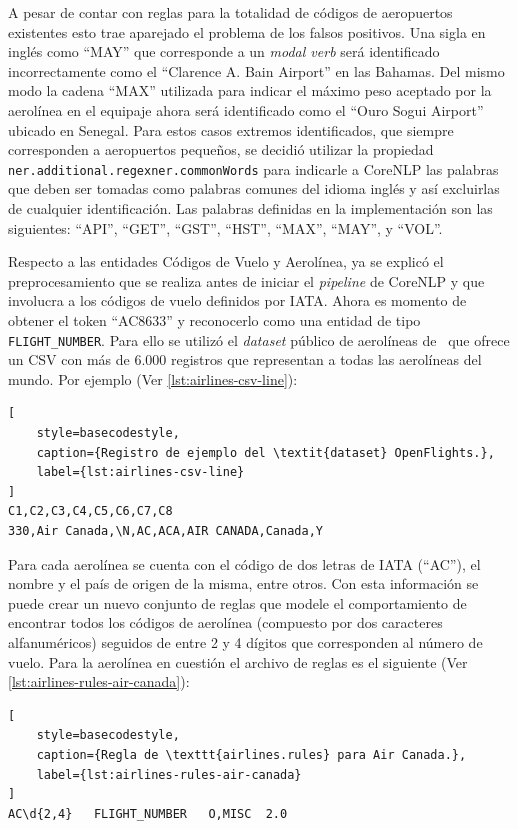 A pesar de contar con reglas para la totalidad de códigos de aeropuertos existentes esto trae aparejado el problema de
los falsos positivos.
Una sigla en inglés como ``MAY'' que corresponde a un \textit{modal verb} será identificado incorrectamente como el
``Clarence A. Bain Airport'' en las Bahamas.
Del mismo modo la cadena ``MAX'' utilizada para indicar el máximo peso aceptado por la aerolínea en el equipaje ahora
será identificado como el ``Ouro Sogui Airport'' ubicado en Senegal.
Para estos casos extremos identificados, que siempre corresponden a aeropuertos pequeños, se decidió utilizar la
propiedad \texttt{ner.additional.regexner.commonWords} para indicarle a CoreNLP las palabras que deben ser tomadas como
palabras comunes del idioma inglés y así excluirlas de cualquier identificación.
Las palabras definidas en la implementación son las siguientes: ``API'', ``GET'', ``GST'', ``HST'', ``MAX'', ``MAY'', y
``VOL''.

Respecto a las entidades Códigos de Vuelo y Aerolínea, ya se explicó el preprocesamiento que se realiza antes de iniciar
el \textit{pipeline} de CoreNLP y que involucra a los códigos de vuelo definidos por IATA\@.
Ahora es momento de obtener el token ``AC8633'' y reconocerlo como una entidad de tipo \texttt{FLIGHT\_NUMBER}.
Para ello se utilizó el \textit{dataset} público de aerolíneas de~\cite{openflights-data}
que ofrece un CSV con más de 6.000 registros que representan a todas las aerolíneas del mundo.
Por ejemplo (Ver \autoref{lst:airlines-csv-line}):

\begin{lstlisting}[
    style=basecodestyle,
    caption={Registro de ejemplo del \textit{dataset} OpenFlights.},
    label={lst:airlines-csv-line}
]
C1,C2,C3,C4,C5,C6,C7,C8
330,Air Canada,\N,AC,ACA,AIR CANADA,Canada,Y
\end{lstlisting}

Para cada aerolínea se cuenta con el código de dos letras de IATA (``AC''), el nombre y el país de origen de la misma,
entre otros.
Con esta información se puede crear un nuevo conjunto de reglas que modele el comportamiento de encontrar todos los
códigos de aerolínea (compuesto por dos caracteres alfanuméricos) seguidos de entre 2 y 4 dígitos que corresponden al
número de vuelo.
Para la aerolínea en cuestión el archivo de reglas es el siguiente (Ver \autoref{lst:airlines-rules-air-canada}):

\begin{lstlisting}[
    style=basecodestyle,
    caption={Regla de \texttt{airlines.rules} para Air Canada.},
    label={lst:airlines-rules-air-canada}
]
AC\d{2,4}	FLIGHT_NUMBER	O,MISC	2.0
\end{lstlisting}

